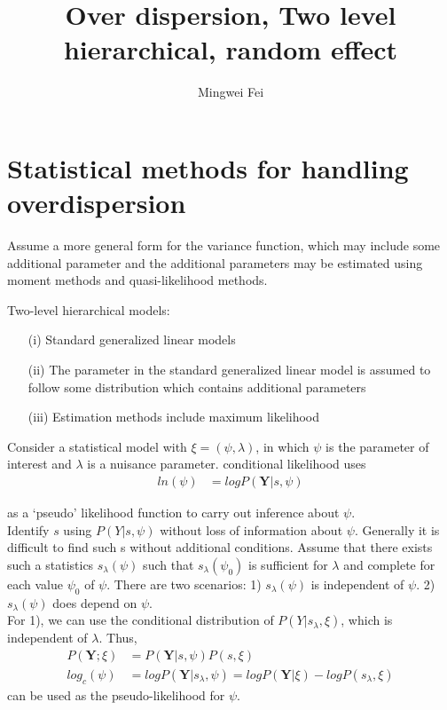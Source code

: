 \documentclass[11pt]{article} %
\title{Over dispersion, Two level hierarchical, random effect}
\author{Mingwei Fei}
\begin{document}
\maketitle

\section{Statistical methods for handling overdispersion}
 
Assume a more general form for the variance function, which may include some additional parameter and the additional parameters may be estimated using moment methods and
quasi-likelihood methods.

Two-level hierarchical models:
\begin{itemize}
	\item [(i)] Standard generalized linear models
	\item [(ii)] The parameter in the standard generalized linear model is assumed to follow some distribution which contains additional parameters
	\item [(iii)] Estimation methods include maximum likelihood
\end{itemize}






Consider a statistical model with $\xi = (\psi, \lambda)$, in which  $\psi$ is the parameter of interest and  $ \lambda$ is a nuisance parameter. conditional likelihood uses 
\begin{align*}
    ln(\psi) &= log P(\textbf{Y}| s, \psi) 
\end{align*}

as a ‘pseudo’ likelihood function to carry out inference about $\psi$.\\
Identify $s$ using $P(Y| s, \psi)$ without loss of information about $\psi$. Generally it is difficult to find such s without additional conditions. Assume that there exists such a statistics $s_{\lambda}(\psi)$ such that $s_{\lambda}(\psi_0)$ is sufficient for $\lambda$ and complete for each value $\psi_0$ of $\psi$. There are two scenarios: 1) $s_{\lambda}(\psi)$ is independent of $\psi$. 2) $s_{\lambda}(\psi)$ does depend on $\psi$. \\
For 1), we can use the conditional distribution of $P(Y| s_{\lambda}, \xi)$, which is independent of $\lambda$. Thus,
\begin{align*}
    P(\textbf{Y}; \xi) &= P(\textbf{Y}| s, \psi) P( s, \xi)\\
    log_c(\psi) &= log P(\textbf{Y}| s_{\lambda}, \psi) = log P(\textbf{Y}| \xi) - log P( s_{\lambda}, \xi)
\end{align*}
can be used as the pseudo-likelihood for $\psi$. \\
\end{document}
